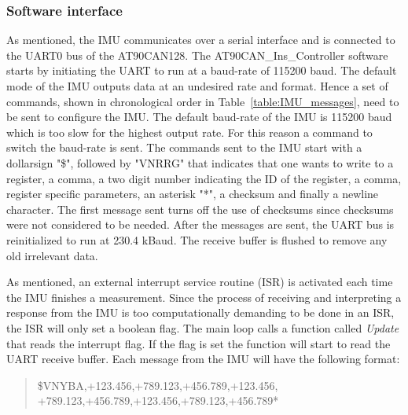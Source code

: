 \subsubsection{Software interface}
As mentioned, the IMU communicates over a serial interface and is connected to the UART0 bus of the AT90CAN128. The AT90CAN\_Ins\_Controller software starts by initiating the UART to run at a baud-rate of 115200 baud. \newline
The default mode of the IMU outputs data at an undesired rate and format. Hence a set of commands, shown in chronological order in Table~\ref{table:IMU_messages}, need to be sent to configure the IMU. The default baud-rate of the IMU is 115200 baud which is too slow for the highest output rate. For this reason a command to switch the baud-rate is sent. \newline
The commands sent to the IMU start with a dollarsign "\$", followed by "VNRRG" that indicates that one wants to write to a register, a comma, a two digit number indicating the ID of the register, a comma, register specific parameters, an asterisk "*", a checksum and finally a newline character. 
The first message sent turns off the use of checksums since checksums were not considered to be needed. \newline
After the messages are sent, the UART bus is reinitialized to run at 230.4 kBaud. The receive buffer is flushed to remove any old irrelevant data.

As mentioned, an external interrupt service routine (ISR) is activated each time the IMU finishes a measurement. Since the process of receiving and interpreting a response from the IMU is too computationally demanding to be done in an ISR, the ISR will only set a boolean flag. \newline
The main loop calls a function called \emph{Update} that reads the interrupt flag. If the flag is set the function will start to read the UART receive buffer. Each message from the IMU will have the following format: 

\begin{quote}
   \$VNYBA,+123.456,+789.123,+456.789,+123.456, \newline
   +789.123,+456.789,+123.456,+789.123,+456.789*
\end{quote}

